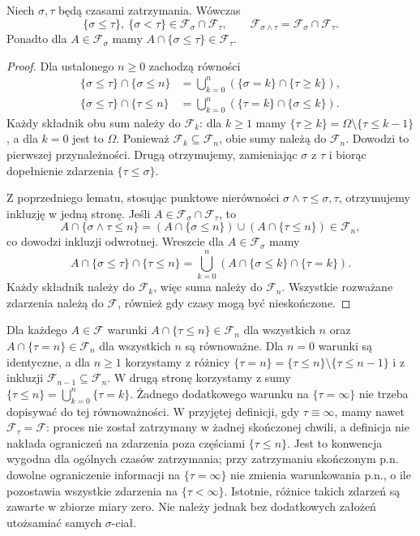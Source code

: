 \begin{lemat}
\label{lem:rp1-13-stopping-comparison}
Niech $\sigma,\tau$ będą czasami zatrzymania.
Wówczas
\[
\{\sigma\leq\tau\},\ \{\sigma<\tau\}
\in\mathcal F_\sigma\cap\mathcal F_\tau,
\qquad
\mathcal F_{\sigma\wedge\tau}
=\mathcal F_\sigma\cap\mathcal F_\tau.
\]
Ponadto dla $A\in\mathcal F_\sigma$ mamy
$A\cap\{\sigma\leq\tau\}\in\mathcal F_\tau$.
\end{lemat}
\begin{proof}
Dla ustalonego $n\geq0$ zachodzą równości
\begin{align*}
\{\sigma\leq\tau\}\cap\{\sigma\leq n\}
&=\bigcup_{k=0}^n
  (\{\sigma=k\}\cap\{\tau\geq k\}),\\
\{\sigma\leq\tau\}\cap\{\tau\leq n\}
&=\bigcup_{k=0}^n
  (\{\tau=k\}\cap\{\sigma\leq k\}).
\end{align*}
Każdy składnik obu sum należy do $\mathcal F_k$:
dla $k\geq1$ mamy
$\{\tau\geq k\}=\Omega\setminus\{\tau\leq k-1\}$,
a dla $k=0$ jest to $\Omega$.
Ponieważ $\mathcal F_k\subseteq\mathcal F_n$,
obie sumy należą do $\mathcal F_n$.
Dowodzi to pierwszej przynależności.
Drugą otrzymujemy, zamieniając $\sigma$ z $\tau$
i biorąc dopełnienie zdarzenia $\{\tau\leq\sigma\}$.

Z poprzedniego lematu, stosując punktowe
nierówności $\sigma\wedge\tau\leq\sigma,\tau$,
otrzymujemy inkluzję w jedną stronę.
Jeśli $A\in\mathcal F_\sigma\cap\mathcal F_\tau$,
to
\[
A\cap\{\sigma\wedge\tau\leq n\}
=(A\cap\{\sigma\leq n\})\cup
 (A\cap\{\tau\leq n\})\in\mathcal F_n,
\]
co dowodzi inkluzji odwrotnej.
Wreszcie dla $A\in\mathcal F_\sigma$ mamy
\[
A\cap\{\sigma\leq\tau\}\cap\{\tau\leq n\}
=\bigcup_{k=0}^n
  (A\cap\{\sigma\leq k\}\cap\{\tau=k\}).
\]
Każdy składnik należy do $\mathcal F_k$,
więc suma należy do $\mathcal F_n$.
Wszystkie rozważane zdarzenia należą do
$\mathcal F$, również gdy czasy mogą być nieskończone.
\end{proof}

\begin{uwaga}
Dla każdego $A\in\mathcal F$ warunki
$A\cap\{\tau\leq n\}\in\mathcal F_n$ dla wszystkich $n$
oraz $A\cap\{\tau=n\}\in\mathcal F_n$ dla wszystkich $n$
są równoważne. Dla $n=0$ warunki są identyczne,
a dla $n\geq1$ korzystamy z różnicy
$\{\tau=n\}=\{\tau\leq n\}\setminus\{\tau\leq n-1\}$
i z inkluzji $\mathcal F_{n-1}\subseteq\mathcal F_n$.
W drugą stronę korzystamy z sumy
$\{\tau\leq n\}=\bigcup_{k=0}^n\{\tau=k\}$.
Żadnego dodatkowego warunku na $\{\tau=\infty\}$
nie trzeba dopisywać do tej równoważności.
W przyjętej definicji, gdy $\tau\equiv\infty$,
mamy nawet $\mathcal F_\tau=\mathcal F$:
proces nie został zatrzymany w żadnej skończonej chwili,
a definicja nie nakłada ograniczeń na zdarzenia
poza częściami $\{\tau\leq n\}$. Jest to konwencja
wygodna dla ogólnych czasów zatrzymania;
przy zatrzymaniu skończonym p.n. dowolne
ograniczenie informacji na $\{\tau=\infty\}$
nie zmienia warunkowania p.n., o ile pozostawia
wszystkie zdarzenia na $\{\tau<\infty\}$.
Istotnie, różnice takich zdarzeń są zawarte
w zbiorze miary zero. Nie należy jednak bez
dodatkowych założeń utożsamiać samych $\sigma$-ciał.
\end{uwaga}


